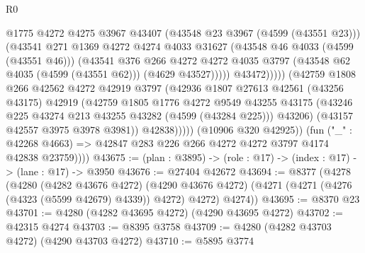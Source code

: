\begin{lexlean}{R0}
\begin{coremodule}
                                  @1775
                                  @4272
                                  @4275
                                  @3967
                                  @43407
                                  (@43548 @23 @3967 (@4599 (@43551 @23)))
                                  (@43541
                                    @271
                                    @1369
                                    @4272
                                    @4274
                                    @4033
                                    @31627
                                    (@43548 @46 @4033 (@4599 (@43551 @46)))
                                    (@43541
                                      @376
                                      @266
                                      @4272
                                      @4272
                                      @4035
                                      @3797
                                      (@43548 @62 @4035 (@4599 (@43551 @62)))
                                      (@4629 @43527)))))
                              @43472)))))
                    (@42759
                      @1808
                      @266
                      @42562
                      @4272
                      @42919
                      @3797
                      (@42936
                        @1807
                        @27613
                        @42561
                        (@43256 @43175)
                        @42919
                        (@42759
                          @1805
                          @1776
                          @4272
                          @9549
                          @43255
                          @43175
                          (@43246 @225 @43274 @213 @43255 @43282 (@4599 (@43284 @225)))
                          @43206)
                        (@43157 @42557 @3975 @3978 @3981))
                      @42838)))))
            (@10906 @320 @42925))
          (fun ("_" : @42268 @4663) =>
          @42847 @283 @226 @266 @4272 @4272 @3797 @4174 @42838 @23759))))
@43675 := (plan : @3895) -> (role : @17) -> (index : @17) -> (lane : @17) -> @3950
@43676 := @27404 @42672
@43694 := @8377
    (@4278
      (@4280
        (@4282 @43676 @4272)
        (@4290 @43676 @4272)
        (@4271 (@4271 (@4276 (@4323 (@5599 @42679) @4339)) @4272) @4272)
        @4274))
@43695 := @8370 @23
@43701 := @4280 (@4282 @43695 @4272) (@4290 @43695 @4272)
@43702 := @42315 @4274
@43703 := @8395 @3758
@43709 := @4280 (@4282 @43703 @4272) (@4290 @43703 @4272)
@43710 := @5895 @3774

\end{coremodule}
\end{lexlean}
